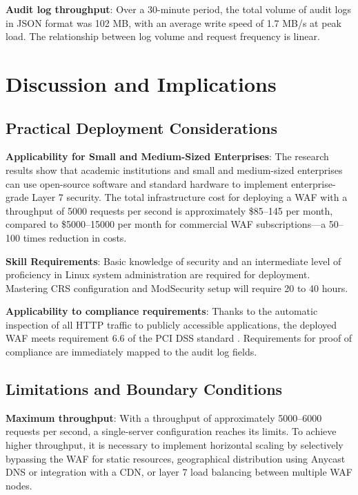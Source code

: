 \documentclass[10pt,conference]{IEEEtran}
\begin{document}
\textbf{Audit log throughput}: Over a 30-minute period, the total volume of audit logs in JSON format was 102 MB, with an average write speed of 1.7 MB/s at peak load. The relationship between log volume and request frequency is linear.

\section{Discussion and Implications}

\subsection{Practical Deployment Considerations}

\textbf{Applicability for Small and Medium-Sized Enterprises}: The research results show that academic institutions and small and medium-sized enterprises can use open-source software and standard hardware to implement enterprise-grade Layer 7 security. The total infrastructure cost for deploying a WAF with a throughput of 5000 requests per second is approximately \$85--145 per month, compared to \$5000--15000 per month for commercial WAF subscriptions---a 50--100 times reduction in costs.

\textbf{Skill Requirements}: Basic knowledge of security and an intermediate level of proficiency in Linux system administration are required for deployment. Mastering CRS configuration and ModSecurity setup will require 20 to 40 hours.

\textbf{Applicability to compliance requirements}: Thanks to the automatic inspection of all HTTP traffic to publicly accessible applications, the deployed WAF meets requirement 6.6 of the PCI DSS standard \cite{pci_dss_66}. Requirements for proof of compliance are immediately mapped to the audit log fields.

\subsection{Limitations and Boundary Conditions}

\textbf{Maximum throughput}: With a throughput of approximately 5000–6000 requests per second, a single-server configuration reaches its limits. To achieve higher throughput, it is necessary to implement horizontal scaling by selectively bypassing the WAF for static resources, geographical distribution using Anycast DNS or integration with a CDN, or layer 7 load balancing between multiple WAF nodes.
\end{document}
